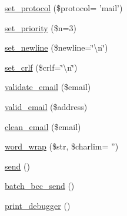 \begin{DoxyCompactItemize}
\item 
\hyperlink{class_c_i___email_a13cb2538ed74c83ea51880a17d90ea78}{set\-\_\-protocol} (\$protocol= 'mail')
\item 
\hyperlink{class_c_i___email_aee3ae37c0bf5f8aca34f6e872efd66b8}{set\-\_\-priority} (\$n=3)
\item 
\hyperlink{class_c_i___email_a095be9606f6f063ee6e1af81b53d405e}{set\-\_\-newline} (\$newline=\char`\"{}\textbackslash{}n\char`\"{})
\item 
\hyperlink{class_c_i___email_a8bfdf8b14a9dcf4ee18b52c0a2afa833}{set\-\_\-crlf} (\$crlf=\char`\"{}\textbackslash{}n\char`\"{})
\item 
\hyperlink{class_c_i___email_a1907f0dba44e2968b8260dbc5770550f}{validate\-\_\-email} (\$email)
\item 
\hyperlink{class_c_i___email_a11d4ec9495d0996dd708fa17156c4249}{valid\-\_\-email} (\$address)
\item 
\hyperlink{class_c_i___email_ab8139994bc1b1bee3d2750b627cdd0c6}{clean\-\_\-email} (\$email)
\item 
\hyperlink{class_c_i___email_af08e48360b359f5278ced30240fc248f}{word\-\_\-wrap} (\$str, \$charlim= '')
\item 
\hyperlink{class_c_i___email_a12bcef5130168b80d3d52dc82213f19a}{send} ()
\item 
\hyperlink{class_c_i___email_a889f14cabfcfe05b5c0d0dbbb8f557e0}{batch\-\_\-bcc\-\_\-send} ()
\item 
\hyperlink{class_c_i___email_ad02580b0ba88f7b2e96928741273eeec}{print\-\_\-debugger} ()
\end{DoxyCompactItemize}
